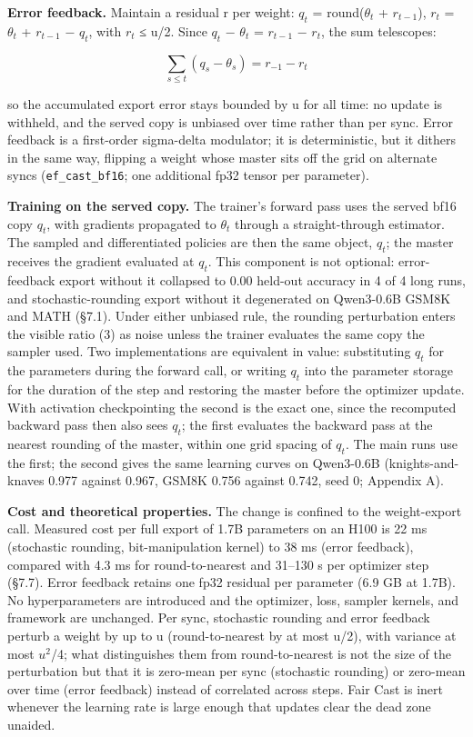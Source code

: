 \documentclass[
  10pt,
]{article}
\begin{document}
\textbf{Error feedback.} Maintain a residual r per weight: \(q_t\) = round(\(\theta_t\) +
\(r_{t- 1}\)), \(r_t\) = \(\theta_t\) + \(r_{t- 1}\) − \(q_t\), with \textbar{}\(r_t\)\textbar{} ≤
u/2. Since \(q_t\) − \(\theta_t\) = \(r_{t- 1}\) − \(r_t\), the sum telescopes:

\begin{equation}
\sum_{s\le t} (q_{s} - \theta_{s}) = r_{- 1} - r_{t}
\end{equation}

so the accumulated export error stays bounded by u for all time: no update is withheld, and the
served copy is unbiased over time rather than per sync. Error feedback is a first-order sigma-delta
modulator; it is deterministic, but it dithers in the same way, flipping a weight whose master sits
off the grid on alternate syncs (\texttt{ef\_cast\_bf16}; one additional fp32 tensor per parameter).

\textbf{Training on the served copy.} The trainer's forward pass uses the served bf16 copy \(q_t\),
with gradients propagated to \(\theta_t\) through a straight-through estimator. The sampled and
differentiated policies are then the same object, \(q_t\); the master receives the gradient
evaluated at \(q_t\). This component is not optional: error-feedback export without it collapsed to
0.00 held-out accuracy in 4 of 4 long runs, and stochastic-rounding export without it degenerated on
Qwen3-0.6B GSM8K and MATH (§7.1). Under either unbiased rule, the rounding perturbation enters the
visible ratio (3) as noise unless the trainer evaluates the same copy the sampler used. Two
implementations are equivalent in value: substituting \(q_t\) for the parameters during the forward
call, or writing \(q_t\) into the parameter storage for the duration of the step and restoring the
master before the optimizer update. With activation checkpointing the second is the exact one, since
the recomputed backward pass then also sees \(q_t\); the first evaluates the backward pass at the
nearest rounding of the master, within one grid spacing of \(q_t\). The main runs use the first; the
second gives the same learning curves on Qwen3-0.6B (knights-and-knaves 0.977 against 0.967, GSM8K
0.756 against 0.742, seed 0; Appendix A).

\textbf{Cost and theoretical properties.} The change is confined to the weight-export call. Measured
cost per full export of 1.7B parameters on an H100 is 22 ms (stochastic rounding, bit-manipulation
kernel) to 38 ms (error feedback), compared with 4.3 ms for round-to-nearest and 31--130 s per
optimizer step (§7.7). Error feedback retains one fp32 residual per parameter (6.9 GB at 1.7B). No
hyperparameters are introduced and the optimizer, loss, sampler kernels, and framework are
unchanged. Per sync, stochastic rounding and error feedback perturb a weight by up to u
(round-to-nearest by at most u/2), with variance at most \(u^{2}\)/4; what distinguishes them from
round-to-nearest is not the size of the perturbation but that it is zero-mean per sync (stochastic
rounding) or zero-mean over time (error feedback) instead of correlated across steps. Fair Cast is
inert whenever the learning rate is large enough that updates clear the dead zone unaided.
\end{document}
